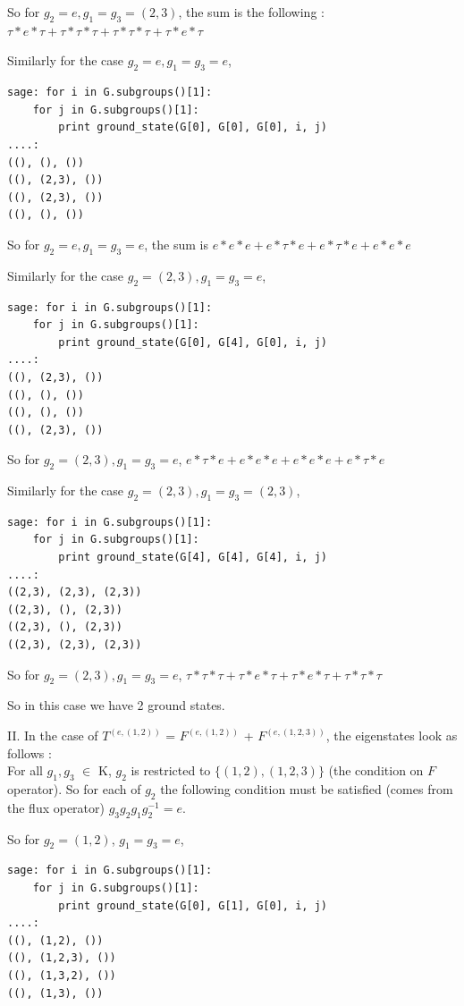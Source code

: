 So for $g_{2} = e, g_{1} = g_{3} = (2,3)$, the sum is the following : 
$\tau*e*\tau + \tau*\tau*\tau + \tau*\tau*\tau + \tau*e*\tau$

Similarly for the case $g_{2} = e, g_{1} = g_{3} = e$,
\begin{lstlisting}[frame=single]
sage: for i in G.subgroups()[1]:
    for j in G.subgroups()[1]:
        print ground_state(G[0], G[0], G[0], i, j)
....: 
((), (), ())
((), (2,3), ())
((), (2,3), ())
((), (), ())
\end{lstlisting}

So for $g_{2} = e, g_{1} = g_{3} = e$, the sum is 
$e*e*e + e*\tau*e + e*\tau*e + e*e*e$

Similarly for the case $g_{2} = (2,3), g_{1} = g_{3} = e$, 
\begin{lstlisting}[frame=single]
sage: for i in G.subgroups()[1]:
    for j in G.subgroups()[1]:
        print ground_state(G[0], G[4], G[0], i, j)
....: 
((), (2,3), ())
((), (), ())
((), (), ())
((), (2,3), ())
\end{lstlisting}

So for $g_{2} = (2,3), g_{1} = g_{3} = e$,
$e*\tau*e + e*e*e + e*e*e + e*\tau*e$

Similarly for the case $g_{2} = (2,3), g_{1} = g_{3} = (2,3)$, 
\begin{lstlisting}[frame=single]
sage: for i in G.subgroups()[1]:
    for j in G.subgroups()[1]:
        print ground_state(G[4], G[4], G[4], i, j)
....: 
((2,3), (2,3), (2,3))
((2,3), (), (2,3))
((2,3), (), (2,3))
((2,3), (2,3), (2,3))
\end{lstlisting}

So for $g_{2} = (2,3), g_{1} = g_{3} = e$, 
$\tau*\tau*\tau + \tau*e*\tau + \tau*e*\tau + \tau*\tau*\tau$

So in this case we have 2 ground states.

II. In the case of $T^{(e,(1,2))}$ = $F^{(e,(1,2))}$ + $F^{(e,(1,2,3))}$, the eigenstates look as follows : \\
For all  $g_{1}, g_{3}$ $\in$ K, $g_{2}$ is restricted to  $\{(1,2), (1,2,3)\}$ (the condition on $F$ operator).
So for each of $g_{2}$ the following condition must be satisfied (comes from the flux operator) $g_{3}g_{2}g_{1}g_{2}^{-1} =  e$.
 
So for $g_{2} = (1,2)$, $g_{1} = g_{3} = e$,  
\begin{lstlisting}[frame=single]
sage: for i in G.subgroups()[1]:
    for j in G.subgroups()[1]:
        print ground_state(G[0], G[1], G[0], i, j)
....: 
((), (1,2), ())
((), (1,2,3), ())
((), (1,3,2), ())
((), (1,3), ())
\end{lstlisting}

